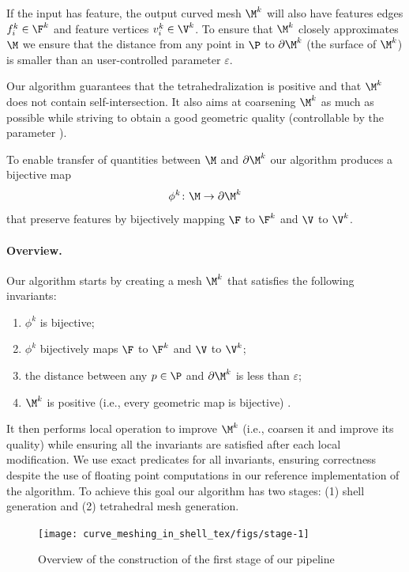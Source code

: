 If the input has feature, the output curved mesh $\M^k$ will also have features edges $f_i^k\in\F^k$ and feature vertices $v_i^k\in\V^k$. To ensure that $\M^k$ closely approximates $\M$ we ensure that the distance from any point in $\P$ to $\partial\M^k$ (the surface of $\M^k$) is smaller than an user-controlled parameter $\varepsilon$.

Our algorithm guarantees that the tetrahedralization is positive and that $\M^k$ does not contain self-intersection. It also aims at coarsening $\M^k$ as much as possible while striving to obtain a  good geometric quality (controllable by the parameter ). 

To enable transfer of quantities between $\M$ and $\partial\M^k$ our algorithm produces a bijective map 
\[
\phi^k \colon \M \to \partial \M^k
\]
that preserve features by bijectively mapping $\F$ to $\F^k$ and $\V$ to $\V^k$. 

\paragraph{Overview.} Our algorithm starts by creating a mesh $\M^k$ that satisfies the following invariants:
\begin{enumerate}
    \item $\phi^k$ is bijective;
    \item $\phi^k$ bijectively maps $\F$ to $\F^k$ and $\V$ to $\V^k$;
    \item the distance between any $p\in\P$ and $\partial\M^k$ is less than $\varepsilon$;
    \item $\M^k$ is positive (i.e., every geometric map is bijective) .
\end{enumerate}
It then performs local operation to improve $\M^k$ (i.e., coarsen it and improve its quality) while ensuring all the invariants are satisfied after each local modification. We use exact predicates for all invariants, ensuring correctness despite the use of floating point computations in our reference implementation of the algorithm. To achieve this goal our algorithm has two stages: (1) shell generation and (2) tetrahedral mesh generation.


\begin{figure}
    \centering
    \texttt{[image: curve\_meshing\_in\_shell\_tex/figs/stage-1]}
    \caption{Overview of the construction of the first stage of our pipeline}
    \label{bichon:fig:stage-1}
\end{figure}
